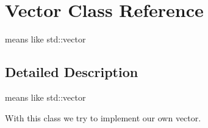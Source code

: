 \hypertarget{class_vector}{}\section{Vector Class Reference}
\label{class_vector}


means like std\+::vector  




\subsection{Detailed Description}
means like std\+::vector 

With this class we try to implement our own vector. 